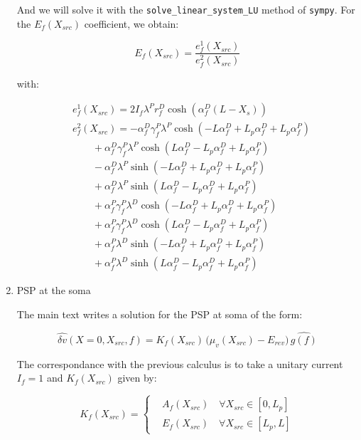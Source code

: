 \documentclass[colorlinks]{article}
\begin{document}
\begin{enumerate}
And we will solve it with the \texttt{solve\_linear\_system\_LU} method of
\texttt{sympy}. For the $E_f(X_{src})$ coefficient, we obtain:

\begin{equation}
E_f(X_{src}) = \frac{e^1_f(X_{src})}{e^2_f(X_{src})}
\end{equation}

with:

\begin{equation}
\begin{split}
& e^1_f(X_{src}) = 2 I_{f} \lambda^{P} r^{D}_{f} \cosh{\left (\alpha^{D}_{f} \left(L - X_{s}\right) \right )} \\
& e^2_f(X_{src}) = - \alpha^{D}_{f} \gamma^{P}_{f} \lambda^{P} \cosh{\left (- L \alpha^{D}_{f} + L_{p} \alpha^{D}_{f} + L_{p} \alpha^{P}_{f} \right )} \\
& \qquad + \alpha^{D}_{f} \gamma^{P}_{f} \lambda^{P} \cosh{\left (L \alpha^{D}_{f} - L_{p} \alpha^{D}_{f} + L_{p} \alpha^{P}_{f} \right )}  \\
& \qquad- \alpha^{D}_{f} \lambda^{P} \sinh{\left (- L \alpha^{D}_{f} + L_{p} \alpha^{D}_{f} + L_{p} \alpha^{P}_{f} \right )}  \\
& \qquad+ \alpha^{D}_{f} \lambda^{P} \sinh{\left (L \alpha^{D}_{f} - L_{p} \alpha^{D}_{f} + L_{p} \alpha^{P}_{f} \right )}  \\
& \qquad+ \alpha^{P}_{f} \gamma^{P}_{f} \lambda^{D} \cosh{\left (- L \alpha^{D}_{f} + L_{p} \alpha^{D}_{f} + L_{p} \alpha^{P}_{f} \right )}  \\
& \qquad+ \alpha^{P}_{f} \gamma^{P}_{f} \lambda^{D} \cosh{\left (L \alpha^{D}_{f} - L_{p} \alpha^{D}_{f} + L_{p} \alpha^{P}_{f} \right )}  \\
& \qquad+ \alpha^{P}_{f} \lambda^{D} \sinh{\left (- L \alpha^{D}_{f} + L_{p} \alpha^{D}_{f} + L_{p} \alpha^{P}_{f} \right )}  \\
& \qquad+ \alpha^{P}_{f} \lambda^{D} \sinh{\left (L \alpha^{D}_{f} - L_{p} \alpha^{D}_{f} + L_{p} \alpha^{P}_{f} \right )}
\end{split}
\end{equation}


\item PSP at the soma
\label{sec-3-0-0-3}

The main text writes a solution for the PSP at soma of the form:

\begin{equation}
\hat{\delta v}(X=0, X_{src}, f) = K_f(X_{src}) \, 
\big(\mu_v(X_{src})-E_{rev}\big) \,  \hat{g(f)} 
\end{equation}

The correspondance with the previous calculus is to take a unitary
current \(I_f=1\) and \( K_f(X_{src}) \) given by:

\begin{equation}
K_f(X_{src}) = 
\left\{
\begin{split}
& A_f(X_{src}) \quad \forall X_{src} \in [0,L_p] \\
& E_f(X_{src}) \quad \forall X_{src} \in [L_p, L]
\end{split}
\right.
\end{equation}
\end{enumerate}
\end{document}
